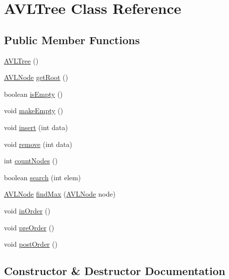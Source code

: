 \hypertarget{class_a_v_l_tree}{}\section{A\+V\+L\+Tree Class Reference}
\label{class_a_v_l_tree}
\subsection*{Public Member Functions}
\begin{DoxyCompactItemize}
\item 
\hyperlink{class_a_v_l_tree_ad07d28d73c68e764805786a80ac3bdcd}{A\+V\+L\+Tree} ()
\item 
\hyperlink{class_a_v_l_node}{A\+V\+L\+Node} \hyperlink{class_a_v_l_tree_ac8f00eba9fa31f7e2a6e6f650b350807}{get\+Root} ()
\item 
boolean \hyperlink{class_a_v_l_tree_a6b7ebb217b5d2aa68c752fd25444a725}{is\+Empty} ()
\item 
void \hyperlink{class_a_v_l_tree_a1f434dbe6f1d4d9d9e8eeacc154a09b3}{make\+Empty} ()
\item 
void \hyperlink{class_a_v_l_tree_aa7c89ad4392b83f6172b8f9ee173bb02}{insert} (int data)
\item 
void \hyperlink{class_a_v_l_tree_a60397dd5aa9590dd607d466b291febc1}{remove} (int data)
\item 
int \hyperlink{class_a_v_l_tree_a755e98bd4fa77db97fdeaf45f84b9ada}{count\+Nodes} ()
\item 
boolean \hyperlink{class_a_v_l_tree_aa77f706705e3f71c4833c84d23b49106}{search} (int elem)
\item 
\hyperlink{class_a_v_l_node}{A\+V\+L\+Node} \hyperlink{class_a_v_l_tree_a994bfddd00fb4ead30941d94028e3e08}{find\+Max} (\hyperlink{class_a_v_l_node}{A\+V\+L\+Node} node)
\item 
void \hyperlink{class_a_v_l_tree_a7342a85f67f1d2d35c4f646051e1a11f}{in\+Order} ()
\item 
void \hyperlink{class_a_v_l_tree_a19af80e1d2d813c52251ec237fc8ceea}{pre\+Order} ()
\item 
void \hyperlink{class_a_v_l_tree_ac5a7e2545b2469c22ca3b056034d8f5e}{post\+Order} ()
\end{DoxyCompactItemize}


\subsection{Constructor \& Destructor Documentation}
\hypertarget{class_a_v_l_tree_ad07d28d73c68e764805786a80ac3bdcd}{}
